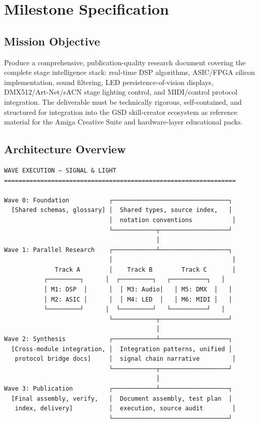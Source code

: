 \documentclass[11pt,letterpaper]{article}
\newcommand{\stageheader}[2]{%
  \noindent\colorbox{#2}{\makebox[\textwidth][l]{%
    \textcolor{white}{\bfseries\sffamily\hspace{6pt}#1\hspace{6pt}}}}%
  \vspace{0.5em}\par%
}
\begin{document}
\newpage

\stageheader{STAGE 3 --- MISSION PACKAGE}{tertiary}

\section{Milestone Specification}

\subsection{Mission Objective}

Produce a comprehensive, publication-quality research document covering the complete stage intelligence stack: real-time DSP algorithms, ASIC/FPGA silicon implementation, sound filtering, LED persistence-of-vision displays, DMX512/Art-Net/sACN stage lighting control, and MIDI/control protocol integration. The deliverable must be technically rigorous, self-contained, and structured for integration into the GSD skill-creator ecosystem as reference material for the Amiga Creative Suite and hardware-layer educational packs.

\subsection{Architecture Overview}

\begin{asciibox}
\begin{verbatim}
WAVE EXECUTION — SIGNAL & LIGHT
================================================================

Wave 0: Foundation           ┌────────────────────────────────┐
  [Shared schemas, glossary] │  Shared types, source index,   │
                             │  notation conventions           │
                             └────────────┬───────────────────┘
                                          │
Wave 1: Parallel Research    ┌────────────┴───────────────────┐
                             │                                 │
              Track A        │    Track B        Track C       │
           ┌─────────┐      │  ┌─────────┐   ┌──────────┐   │
           │ M1: DSP  │      │  │ M3: Audio│   │ M5: DMX  │   │
           │ M2: ASIC │      │  │ M4: LED  │   │ M6: MIDI │   │
           └─────────┘      │  └─────────┘   └──────────┘   │
                             └────────────┬───────────────────┘
                                          │
Wave 2: Synthesis            ┌────────────┴───────────────────┐
  [Cross-module integration, │  Integration patterns, unified │
   protocol bridge docs]     │  signal chain narrative         │
                             └────────────┬───────────────────┘
                                          │
Wave 3: Publication          ┌────────────┴───────────────────┐
  [Final assembly, verify,   │  Document assembly, test plan  │
   index, delivery]          │  execution, source audit        │
                             └────────────────────────────────┘
\end{verbatim}
\end{asciibox}
\end{document}

